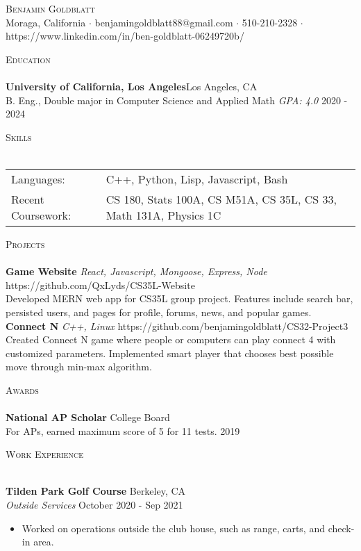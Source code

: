 \documentclass[a4paper]{article}
\newcommand{\lineunder} {
    \vspace*{-8pt} \\
    \hspace*{-18pt} \hrulefill \\
}
\newcommand{\header} [1] {
    {\hspace*{-18pt}\vspace*{6pt} \textsc{#1}}
    \vspace*{-6pt} \lineunder
}
\begin{document}
\vspace*{-40pt}

    

\vspace*{-10pt}
\begin{center}
	{\Huge \scshape {Benjamin Goldblatt}}\\
	Moraga, California $\cdot$ benjamingoldblatt88@gmail.com $\cdot$ 510-210-2328 $\cdot$ https://www.linkedin.com/in/ben-goldblatt-06249720b/\\
\end{center}

\header{Education}
\textbf{University of California, Los Angeles}\hfill Los Angeles, CA\\
B. Eng., Double major in Computer Science and Applied Math \textit{GPA: 4.0} \hfill 2020 - 2024\\
\vspace{2mm}

\header{Skills}
\begin{tabular}{ l l }
	Languages:         & C++, Python, Lisp, Javascript, Bash                               \\
	Recent Coursework: & CS 180, Stats 100A, CS M51A, CS 35L, CS 33, Math 131A, Physics 1C \\
\end{tabular}
\vspace{2mm}

\header{Projects}
{\textbf{Game Website}} {\sl React, Javascript, Mongoose, Express, Node} \hfill https://github.com/QxLyds/CS35L-Website\\
Developed MERN web app for CS35L group project. Features include search bar, persisted users, and pages for profile, forums, news, and popular games.\\
\vspace*{2mm}
{\textbf{Connect N}} {\sl C++, Linux} \hfill https://github.com/benjamingoldblatt/CS32-Project3\\
Created Connect N game where people or computers can play connect 4 with customized parameters. Implemented smart player that chooses best possible move through min-max algorithm.\\
\vspace*{2mm}

\header{Awards}
\textbf{National AP Scholar} \hfill College Board\\
For AP\textquotesingle{}s, earned maximum score of 5 for 11 tests. \hfill 2019\\
\vspace*{2mm}

\header{Work Experience}
\vspace{1mm}

\textbf{Tilden Park Golf Course} \hfill Berkeley, CA\\
\textit{Outside Services} \hfill October 2020 - Sep 2021\\
\vspace{-1mm}
\begin{itemize} \itemsep 1pt
	\item Worked on operations outside the club house, such as range, carts, and check-in area.
\end{itemize}

\ 
\end{document}

